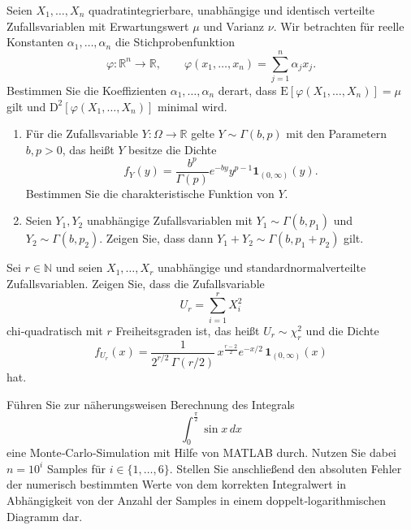 \begin{aufgabe}
Seien \(X_1, \dots, X_n\) quadratintegrierbare, unabhängige und identisch verteilte Zufallsvariablen mit Erwartungswert \(\mu\) und Varianz \(\nu\). Wir betrachten für reelle Konstanten \(\alpha_1,\dots,\alpha_n\) die Stichprobenfunktion
\[
\varphi: \mathbb{R}^n \to \mathbb{R},\qquad
\varphi(x_1,\dots,x_n)=\sum_{j=1}^n \alpha_j x_j.
\]
Bestimmen Sie die Koeffizienten \(\alpha_1,\dots,\alpha_n\) derart, dass \(\mathrm{E}[\varphi(X_1,\dots,X_n)]=\mu\) gilt und \(\mathrm{D}^2[\varphi(X_1,\dots,X_n)]\) minimal wird.
\end{aufgabe}

\begin{aufgabe}
\begin{enumerate}
  \item Für die Zufallsvariable \(Y\colon \Omega\to\mathbb{R}\) gelte \(Y\sim \Gamma(b,p)\) mit den Parametern \(b,p>0\), das heißt \(Y\) besitze die Dichte
  \[
    f_Y(y)
    = \frac{b^p}{\Gamma(p)} e^{-b y} y^{p-1} \mathbf{1}_{(0,\infty)}(y).
  \]
  Bestimmen Sie die charakteristische Funktion von \(Y\).
  \item Seien \(Y_1,Y_2\) unabhängige Zufallsvariablen mit \(Y_1\sim \Gamma(b,p_1)\) und \(Y_2\sim \Gamma(b,p_2)\). Zeigen Sie, dass dann \(Y_1+Y_2\sim \Gamma(b,p_1+p_2)\) gilt.
\end{enumerate}
\end{aufgabe}

\begin{aufgabe}
Sei \(r\in\mathbb{N}\) und seien \(X_1,\dots,X_r\) unabhängige und standardnormalverteilte Zufallsvariablen. Zeigen Sie, dass die Zufallsvariable
\[
  U_r = \sum_{i=1}^r X_i^2
\]
chi‑quadratisch mit \(r\) Freiheitsgraden ist, das heißt \(U_r\sim \chi^2_r\) und die Dichte
\[
  f_{U_r}(x)
  = \frac{1}{2^{r/2}\,\Gamma(r/2)}\,x^{\frac{r-2}{2}}e^{-x/2}\,\mathbf{1}_{(0,\infty)}(x)
\]
hat.
\end{aufgabe}

\begin{aufgabe}
Führen Sie zur näherungsweisen Berechnung des Integrals
\[
  \int_{0}^{\frac{\pi}{2}} \sin x \, dx
\]
eine Monte‑Carlo‑Simulation mit Hilfe von MATLAB durch. Nutzen Sie dabei \(n = 10^i\) Samples für \(i \in \{1,\dots,6\}\). Stellen Sie anschließend den absoluten Fehler der numerisch bestimmten Werte von dem korrekten Integralwert in Abhängigkeit von der Anzahl der Samples in einem doppelt‑logarithmischen Diagramm dar.
\end{aufgabe}

